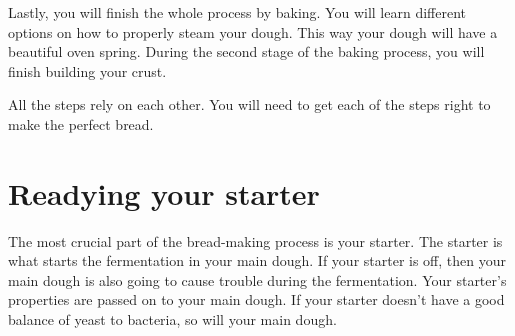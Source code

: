 Lastly, you will finish the whole process by baking. You will learn different
options on how to properly steam your dough. This way your
dough will have a beautiful oven spring. During the second
stage of the baking process, you will finish building your crust.

All the steps rely on each other. You will need to get each of
the steps right to make the perfect bread.

\section{Readying your starter}

The most crucial part of the bread-making process is your starter.
The starter is what starts the fermentation in your main dough.
If your starter is off, then your main dough is also going
to cause trouble during the fermentation. Your starter's
properties are passed on to your main dough. If your starter
doesn't have a good balance of yeast to bacteria, so will your
main dough.

